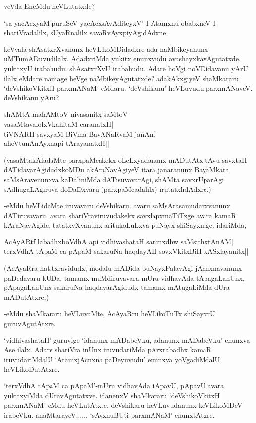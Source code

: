 veVda EneMdu heVLutatxde?

`sa yacAcxyaM puruSeV yacAcxsAvAditeyxV'-I Atamxnu obabxneV I shariVradalilx, sUyaRnalilx savaRvAyxpiyAgidAdxne.

keVvala shAsatxrXvanunx heVLikoMDidadxre adu naMbikeyanunx uMTumADuvudilalx. AdadxriMda yukitx enunxvudu avashayxkavAgutatxde. yukitxyU irabahudu. shAsatxrXvU irabahudu. Adare hoVgi noVDidavanu yArU ilalx eMdare namage heVge naMbikeyAgutatxde? adakAkxgiyeV shaMkararu `deVshikoVkitxH parxmANaM' eMdaru. `deVshikanu' heVLuvudu parxmANaveV. deVshikanu yAru?

\begin{shloka}
shAMtA mahAMtoV nivasanitx saMtoV\\
vasaMtavalolxVkahitaM caranatxH|\\
tiVNARH savxyaM BiVma BavANaRvaM janAnf\\
aheVtunA\s nAyxnapi tArayanatxH||
\end{shloka}

(vasaMtakAladaMte parxpaMcakekx oLeLxyadanunx mADutAtx tAvu savxtaH dATidavarAgidudxkoMDu akAraNavAgiyeV itara janaranunx BayaMkara saMsAravenunxva kaDaliniMda dATisuvavarAgi, shAMta savxrUparAgi sAdhugaLAgiruva doDaDxvaru (parxpaMcadalilx) irutatxlidAdxre.)

-eMdu heVLidaMte iruvavaru deVshikaru. avaru saMsArasamudarxvanunx dATiruvavaru. avara shariVraviruvudakekx savxlapxmaTiTxge avara kamaR kAraNavAgide. tatatxvXvanunx aritukoLuLxva puNayx shiSayxnige. idariMda,

\begin{shloka}
AcAyARtf labadhxboVdhA api vidhivashataH saninxdhw saMsithxtAnAM|\\
terxVdhA tApaM ca pApaM sakaruNa haqdayAH sovxVkitxBiH kASxlayanitx||
\end{shloka}

(AcAyaRra hatitxravidudx, modalu mADida puNayxPalavAgi jAcnxnavanunx paDedavaru kUDa, tamamx muMdiruvavara mUru vidhavAda tApagaLanUnx, pApagaLanUnx sakaruNa haqdayarAgidudx tamamx mAtugaLiMda dUra mADutAtxre.)

-eMdu shaMkararu heVLuvaMte, AcAyaRru heVLikoTuTx shiSayxrU guruvAgutAtxre.

`vidhivashataH' guruvige `idanunx mADabeVku, adanunx mADabeVku' enunxva Ase ilalx. Adare shariVra inUnx iruvudariMda pArxrabadhx kamaR iruvudariMdalU `AtamxjAcnxna paDeyuvudu' enunxva yoVgadiMdalU heVLikoDutAtxre.

`terxVdhA tApaM ca pApaM'-mUru vidhavAda tApavU, pApavU avara yukitxyiMda dUravAgutatxve. idanenxV shaMkararu `deVshikoVkitxH parxmANaM'-eMdu heVLutAtxre. deVshikaru heVLuvudanunx keVLikoMDeV irabeVku. anaMtaraveV$\ldots\ldots$ `sAvxnuBUti parxmANaM' enunxtAtxre.

